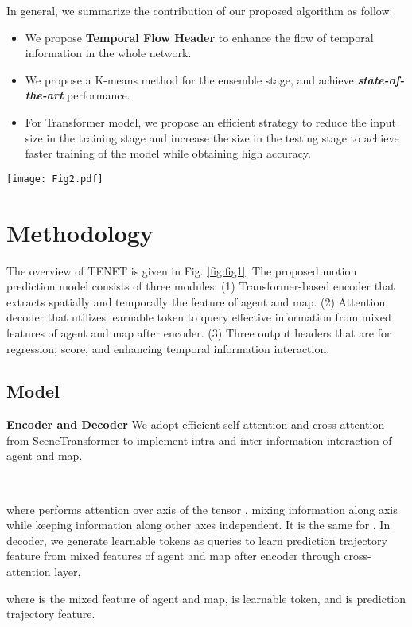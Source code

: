 \documentclass[10pt,twocolumn,letterpaper]{article}
\begin{document}
In general, we summarize the contribution of our proposed algorithm as follow: 

\begin{itemize}
    \item We propose \textbf{Temporal Flow Header}
to enhance the flow of temporal information in the whole network.
    \item We propose a K-means method for the ensemble stage, and
achieve \textbf{\textit{state-of-the-art}} performance.
    \item For Transformer model, we propose an efficient strategy to reduce the input size in the training stage and increase the size in the testing stage to achieve faster training of the model while obtaining high accuracy.
\end{itemize} 



\begin{figure*}[t]
  \centering
  \texttt{[image: Fig2.pdf]}
  \setlength{\abovecaptionskip}{5mm}
  \caption{\textbf{Overall architecture of the proposed model TENET.} }
  \label{fig:fig1}
\end{figure*}

\section{Methodology}
\label{sec:formatting}

The overview of TENET is given in Fig. \ref{fig:fig1}. The proposed motion prediction model consists of three modules: (1) Transformer-based \cite{xiong2020layer} encoder that extracts spatially and temporally the feature of agent and map. (2) Attention decoder that utilizes learnable token \cite{carion2020end} to query effective information from mixed features of agent and map after encoder. (3) Three output headers that are for regression, score, and enhancing temporal information interaction.

\subsection{Model}

\noindent\textbf{Encoder and Decoder} We adopt efficient self-attention and cross-attention from SceneTransformer \cite{ngiam2021scene} to implement intra and inter information interaction of agent and map.
\begin{center}
     \\
    
\end{center}
where  performs attention over axis  of the tensor , mixing information along axis  while keeping information along other axes independent. It is the same for . In decoder, we generate  learnable tokens as queries to learn prediction trajectory feature from mixed features of agent and map after encoder through cross-attention layer,
\begin{center}
    
\end{center}
where  is the mixed feature of agent and map,  is learnable token, and  is prediction trajectory feature.
\end{document}
